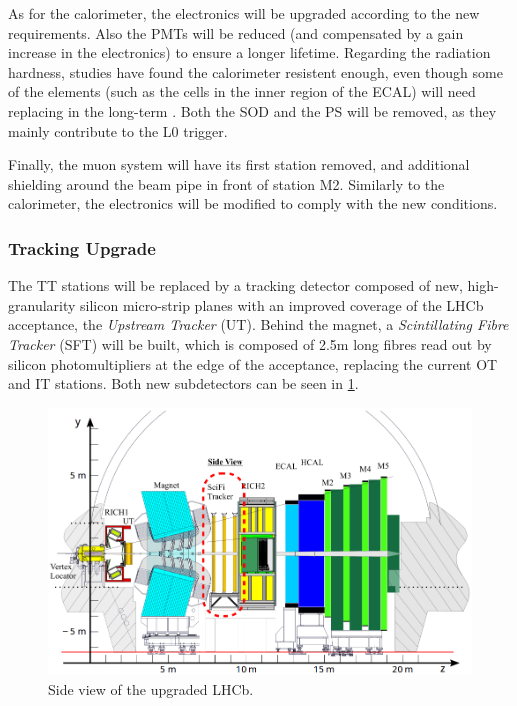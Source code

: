 As for the calorimeter, the electronics will be upgraded according to the new requirements. Also the PMTs  will be reduced (and compensated by a gain increase in the electronics) to ensure a longer lifetime. Regarding the radiation hardness, studies have found the calorimeter resistent enough, even though some of the elements (such as the cells in the inner region of the ECAL) will need replacing in the long-term . Both the SOD and the PS will be removed, as they mainly contribute to the L0 trigger.

Finally, the muon system will have its first station removed, and additional shielding around the beam pipe in front of station M2. Similarly to the calorimeter, the electronics will be modified to comply with the new conditions. 



\subsubsection{Tracking Upgrade} %
The TT stations will be replaced by a tracking detector composed of new, high-granularity silicon micro-strip planes with an improved coverage of the LHCb acceptance, the \textit{Upstream Tracker} (UT). Behind the magnet, a \textit{Scintillating Fibre Tracker} (SFT) will be built, which is composed of 2.5m long fibres read out by silicon photomultipliers at the edge of the acceptance, replacing the current OT and IT stations. Both new subdetectors can be seen in \ref{fig:LHCbUPGRADE}.

\begin{figure} [htb!]
\begin{center}
\includegraphics[scale=0.4]{figs/LHCb_upgrade.png}
\caption{Side view of the upgraded LHCb.\label{fig:LHCbUPGRADE}}
\end{center}
\end{figure}

